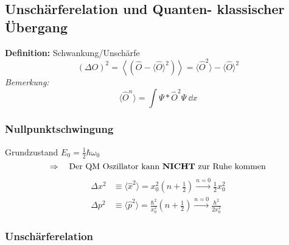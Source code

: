 \subsection{Unschärferelation und Quanten- klassischer Übergang}

\textbf{Definition:} Schwankung/Unschärfe
\begin{equation*}
\left(\Delta O\right)^2 = \left\langle \left(\hat{O} - \langle \hat{O} \rangle ^2\right) \right\rangle = \langle \hat{O}^2 \rangle - \langle \hat{O} \rangle^2
\end{equation*}
\emph{Bemerkung:}
\begin{equation*}
\langle \hat{O}^n \rangle = \int \Psi* \hat{O}^2 \Psi \ \dd x
\end{equation*}

\subsubsection{Nullpunktschwingung}

Grundzustand $ E_0 = \frac{1}{2} \hbar \omega_0 $
\begin{equation*}
\Rightarrow \quad \textrm{Der QM Oszillator kann \textbf{NICHT} zur Ruhe kommen}
\end{equation*}
\begin{align*}
\Delta x^2 &\equiv \langle \hat{x}^2 \rangle = x_0^2 \left(n + \frac{1}{2}\right) \overset{n = 0}{\longrightarrow} \frac{1}{2} x_0^2\\
\Delta p^2 &\equiv \langle \hat{p}^2 \rangle = \frac{\hbar^2}{x_0^2} \left(n + \frac{1}{2}\right) \overset{n = 0}{\longrightarrow} \frac{\hbar^2}{2 x_0^2}
\end{align*}

\subsubsection{Unschärferelation}

